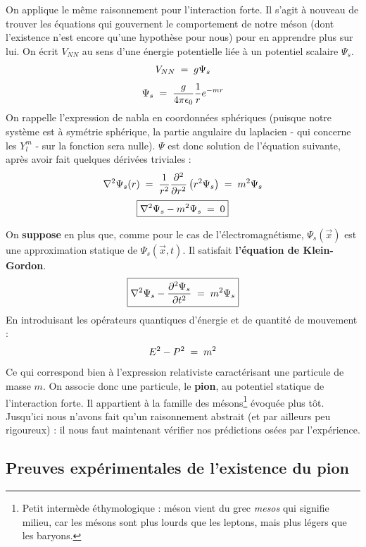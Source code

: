 On applique le même raisonnement pour l'interaction forte. Il s'agit à nouveau de trouver les équations qui gouvernent le comportement de notre méson (dont l'existence n'est encore qu'une hypothèse pour nous) pour en apprendre plus sur lui. On écrit $V_{NN}$ au sens d'une énergie potentielle liée à un potentiel scalaire $\Psi_s$.
\[
    V_{NN} \; = \; g\Psi_s
\]
\[
    \Psi_s \; = \; \dfrac{g}{4\pi\epsilon_0}\dfrac{1}{r}e^{-mr}
\]
On rappelle l'expression de nabla en coordonnées sphériques (puisque notre système est à symétrie sphérique, la partie angulaire du laplacien - qui concerne les $Y^m_l$ - sur la fonction sera nulle). $\Psi$ est donc solution de l'équation suivante, après avoir fait quelques dérivées triviales :
\[
    \nabla^2\Psi_s(r) 
    \; = \; \dfrac{1}{r^2}\dfrac{\partial^2}{\partial r^2}\left(r^2 \Psi_s\right)
    \; = \; m^2 \Psi_s
\]
\[
    \boxed{
        \nabla^2 \Psi_s - m^2\Psi_s \; = \; 0
    }
\]

On \textbf{suppose} en plus que, comme pour le cas de l'électromagnétisme, $\Psi_s(\Vec{x})$ est une approximation statique de $\Psi_s(\Vec{x},t)$. Il satisfait \textbf{l'équation de Klein-Gordon}.
\[
    \boxed{
        \nabla^2\Psi_s - \dfrac{\partial^2\Psi_s}{\partial t^2} \; = \; m^2 \Psi_s
    }
\]
En introduisant les opérateurs quantiques d'énergie et de quantité de mouvement :
\[
    E^2 - P^2 \; = \; m^2
\]
Ce qui correspond bien à l'expression relativiste caractérisant une particule de masse $m$. On associe donc une particule, le \textbf{pion}, au potentiel statique de l'interaction forte. Il appartient à la famille des mésons\footnote{Petit intermède éthymologique : méson vient du grec \emph{mesos} qui signifie milieu, car les mésons sont plus lourds que les leptons, mais plus légers que les baryons.} évoquée plus tôt. Jusqu'ici nous n'avons fait qu'un raisonnement abstrait (et par ailleurs peu rigoureux) : il nous faut maintenant vérifier nos prédictions osées par l'expérience.\\



\subsection{Preuves expérimentales de l'existence du pion}



